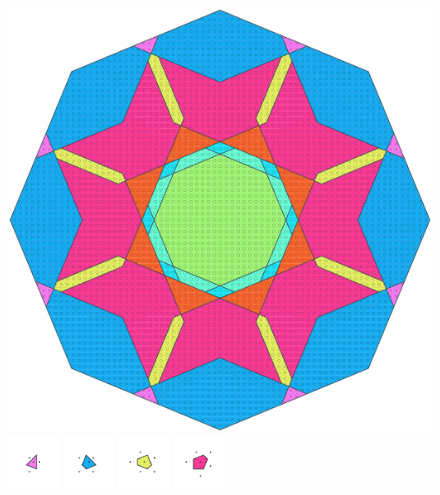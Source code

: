 \documentclass[text.tex]{subfiles}
\begin{document}
\clearpage
\pagestyle{fancy}
\fancyhf{}
\begin{figure}[h!]
\centering
\includegraphics[width=1\textwidth]{img/results/octagon/octagon_145710_(1_2alpha_4).pdf}
\includegraphics[width=0.12\textwidth]{img/results/octagon/octagon_145710_(1_2alpha_4)_001.pdf}
\includegraphics[width=0.12\textwidth]{img/results/octagon/octagon_145710_(1_2alpha_4)_002.pdf}
\includegraphics[width=0.12\textwidth]{img/results/octagon/octagon_145710_(1_2alpha_4)_003.pdf}
\includegraphics[width=0.12\textwidth]{img/results/octagon/octagon_145710_(1_2alpha_4)_004.pdf}

\end{figure}
\end{document}
